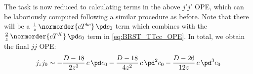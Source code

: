 \documentclass[a4paper,10pt]{article}
\begin{document}
\begin{enumerate}
\begin{enumerate}
	The task is now reduced to calculating terms in the above $j'j'$ OPE, which can be laboriously computed following a similar procedure as before. Note that there will be a $
		\frac{1}{z}\,\normorder{cT^{bc}}\,\pd c_0
	$ term which combines with the $
		\frac{2}{z}\,\normorder{cT^{X}}\,\pd c_0
	$ term in \eqref{eq:BRST_TTcc_OPE}. In total, we obtain the final $jj$ OPE:
	\begin{equation}
		j_z j_0
		\sim - \frac{D-18}{2z^3}\,c\,\pd c_0
			- \frac{D-18}{4z^2}\,c\,\pd^2 c_0
			- \frac{D-26}{12z}\,c\,\pd^3 c_0
	\end{equation}
	

\end{enumerate}
\end{enumerate}
\end{document}
